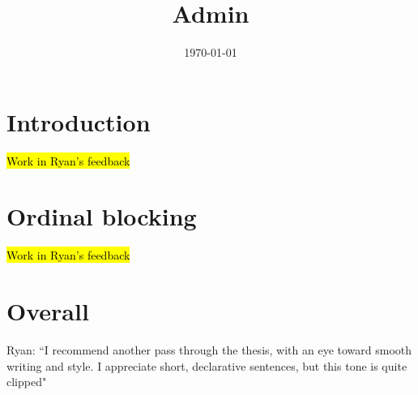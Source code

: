\documentclass[12pt]{article}
\title{Admin}
\date{\today}
\begin{document}
\maketitle

\section*{Introduction}
	\begin{coi}
		\item \hl{Work in Ryan's feedback}
	\end{coi}	

\section*{Ordinal blocking}
	\begin{coi}
		\item \hl{Work in Ryan's feedback}
	\end{coi}
	
\section*{Overall}
	\begin{coi}
		\item Ryan: ``I recommend another pass through the thesis, with an eye toward smooth writing and style. I appreciate short, declarative sentences, but this tone is quite clipped"
	\end{coi}
\end{document}
